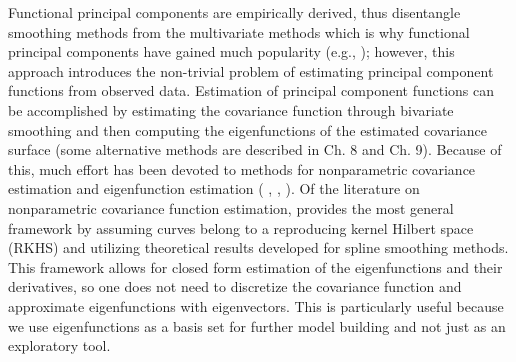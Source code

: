 Functional principal components are empirically derived, thus disentangle smoothing methods from the multivariate methods which is why functional principal components have gained much popularity (e.g., \cite{Yao:2005cv,Di:2009dz,Gromenko:2012ij}); however, this approach introduces the non-trivial problem of estimating principal component functions from observed data. Estimation of principal component functions can be accomplished by estimating the covariance function through bivariate smoothing and then computing the eigenfunctions of the estimated covariance surface (some alternative methods are described in \cite{FDA} Ch. 8 and Ch. 9). Because of this, much effort has been devoted to methods for nonparametric covariance estimation and eigenfunction estimation ( \cite{Yao:2005cv}, \cite{Li:2007dn}, \cite{Cai:2010vr}).  Of the literature on nonparametric covariance function estimation, \cite{Cai:2010vr} provides the most general framework by assuming curves belong to a reproducing kernel Hilbert space (RKHS) and utilizing theoretical results developed for spline smoothing methods. This framework allows for closed form estimation of the eigenfunctions and their derivatives, so one does not need to discretize the covariance function and approximate eigenfunctions with eigenvectors.  This is particularly useful because we use eigenfunctions as a basis set for further model building and not just as an exploratory tool. 

